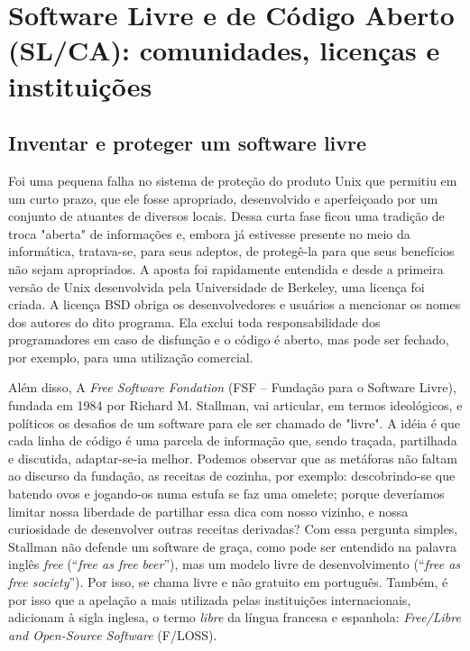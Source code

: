 \section{Software Livre e de Código Aberto (SL/CA): comunidades, licenças e instituições} \label{1.3}

\subsection{Inventar e proteger um software livre} \label{1.3.1}

Foi uma pequena falha no sistema de proteção do produto Unix que permitiu em um curto prazo, que ele fosse apropriado, desenvolvido e aperfeiçoado por um conjunto de atuantes de diversos locais. Dessa curta fase ficou uma tradição de troca "aberta" de informações e, embora já estivesse presente no meio da informática, tratava-se, para seus adeptos, de protegê-la para que seus benefícios não sejam apropriados. A aposta foi rapidamente entendida e desde a primeira versão de Unix desenvolvida pela Universidade de Berkeley, uma licença foi criada. A licença BSD obriga os desenvolvedores e usuários a mencionar os nomes dos autores do dito programa. Ela exclui toda responsabilidade dos programadores em caso de disfunção e o código é aberto, mas pode ser fechado, por exemplo, para uma utilização comercial.

Além disso, A \emph{Free Software Fondation} (FSF – Fundação para o Software Livre), fundada em 1984 por Richard M. Stallman, vai articular, em termos ideológicos, e políticos os desafios de um software para ele ser chamado de "livre". A idéia é que cada linha de código é uma parcela de informação que, sendo traçada, partilhada e discutida, adaptar-se-ia melhor. Podemos observar que as metáforas não faltam ao discurso da fundação, as receitas de cozinha, por exemplo: descobrindo-se que batendo ovos e jogando-os numa estufa se faz uma omelete; porque deveríamos limitar nossa liberdade de partilhar essa dica com nosso vizinho, e nossa curiosidade de desenvolver outras receitas derivadas? Com essa pergunta simples, Stallman não defende um software de graça, como pode ser entendido na palavra inglês \emph{free} (“\emph{free as free beer}”), mas um modelo livre de desenvolvimento (“\emph{free as free society}”). Por isso, se chama livre e não gratuito em português. Também, é por isso que a apelação a mais utilizada pelas instituições internacionais, adicionam à sigla inglesa, o termo \emph{libre} da língua francesa e espanhola: \emph{Free/Libre and Open-Source Software} (F/LOSS).

